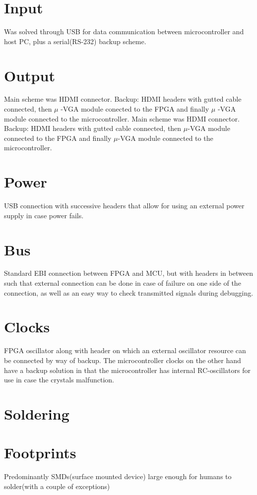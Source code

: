 \section{Input}
Was solved through USB for data communication between microcontroller and host PC, plus a serial(RS-232) backup scheme.

\section{Output}
Main scheme was HDMI connector. Backup: HDMI headers with gutted cable connected, then $\mu$ -VGA module conected to the FPGA and finally $\mu$ -VGA module connected to the microcontroller.
Main scheme was HDMI connector. Backup: HDMI headers with gutted cable connected, then $\mu$-VGA module connected to the FPGA and finally $\mu$-VGA module connected to the microcontroller.

\section{Power}
USB connection with successive headers that allow for using an external power supply in case power fails.

\section{Bus}
Standard EBI connection between FPGA and MCU, but with headers in between such that external connection can be done in case of failure on one side of the connection, as well as an easy way to check transmitted signals during debugging.

\section{Clocks}
FPGA oscillator along with header on which an external oscillator resource can be connected by way of backup.
The microcontroller clocks on the other hand have a backup solution in that the microcontroller has internal RC-oscillators for use in case the crystals malfunction.

\section{Soldering}



\section{Footprints}
Predominantly SMDs(surface mounted device) large enough for humans to solder(with a couple of exceptions)

